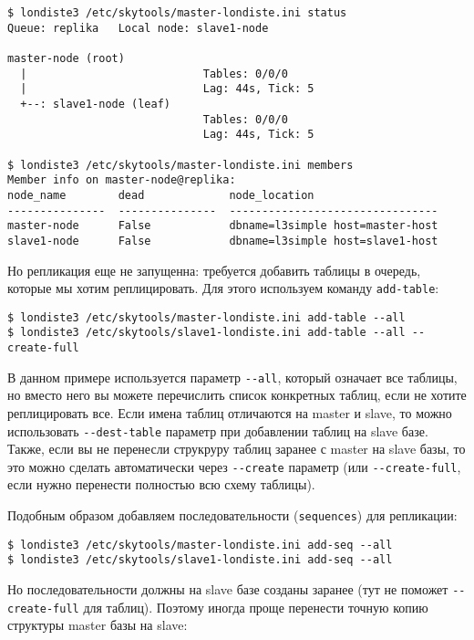 \begin{lstlisting}[label=lst:londiste-replica13,caption=Статус кластера]
$ londiste3 /etc/skytools/master-londiste.ini status
Queue: replika   Local node: slave1-node

master-node (root)
  |                           Tables: 0/0/0
  |                           Lag: 44s, Tick: 5
  +--: slave1-node (leaf)
                              Tables: 0/0/0
                              Lag: 44s, Tick: 5

$ londiste3 /etc/skytools/master-londiste.ini members
Member info on master-node@replika:
node_name        dead             node_location
---------------  ---------------  --------------------------------
master-node      False            dbname=l3simple host=master-host
slave1-node      False            dbname=l3simple host=slave1-host
\end{lstlisting}

Но репликация еще не запущенна: требуется добавить таблицы в очередь, которые мы хотим реплицировать. Для этого используем команду \lstinline!add-table!:

\begin{lstlisting}[label=lst:londiste-replica13,caption=Добавляем таблицы]
$ londiste3 /etc/skytools/master-londiste.ini add-table --all
$ londiste3 /etc/skytools/slave1-londiste.ini add-table --all --create-full
\end{lstlisting}

В данном примере используется параметр \lstinline!--all!, который означает все таблицы, но вместо него вы можете перечислить список конкретных таблиц, если не хотите реплицировать все. Если имена таблиц отличаются на master и slave, то можно использовать \lstinline!--dest-table! параметр при добавлении таблиц на slave базе. Также, если вы не перенесли струкруру таблиц заранее с master на slave базы, то это можно сделать автоматически через \lstinline!--create! параметр (или \lstinline!--create-full!, если нужно перенести полностью всю схему таблицы).

Подобным образом добавляем последовательности (\lstinline!sequences!) для репликации:

\begin{lstlisting}[label=lst:londiste-replica14,caption=Добавляем последовательности]
$ londiste3 /etc/skytools/master-londiste.ini add-seq --all
$ londiste3 /etc/skytools/slave1-londiste.ini add-seq --all
\end{lstlisting}

Но последовательности должны на slave базе созданы заранее (тут не поможет \lstinline!--create-full! для таблиц). Поэтому иногда проще перенести точную копию структуры master базы на slave:

